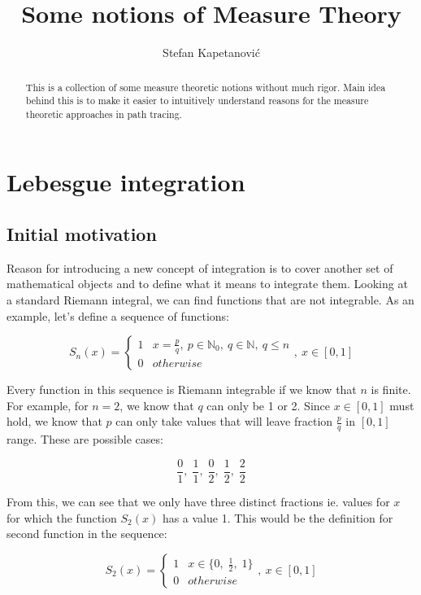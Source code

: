 \documentclass{article}
\title{Some notions of Measure Theory}
\author{Stefan Kapetanović}
\begin{document}
\maketitle

\begin{abstract}
This is a collection of some measure theoretic notions without much rigor. Main idea behind this is to make it easier to intuitively understand reasons for the measure theoretic approaches in path tracing.
\end{abstract}

\section{Lebesgue integration}
\subsection{Initial motivation}

Reason for introducing a new concept of integration is to cover another set of mathematical objects and to define what it means to integrate them. Looking at a standard Riemann integral, we can find functions that are not integrable. As an example, let's define a sequence of functions:

\[ S_n(x) = \begin{cases}
    1 & x = \frac{p}{q},\: p \in \mathbb{N}_0,\: q \in \mathbb{N},\: q \leq n \\
    0 & otherwise
\end{cases},\: x \in [0, 1] \]

Every function in this sequence is Riemann integrable if we know that $n$ is finite. For example, for $n=2$, we know that $q$ can only be 1 or 2. Since $x \in [0, 1]$ must hold, we know that $p$ can only take values that will leave fraction $\frac{p}{q}$ in $[0, 1]$ range. These are possible cases:

\[\frac{0}{1},\;\frac{1}{1},\;\frac{0}{2},\;\frac{1}{2},\;\frac{2}{2}\]

From this, we can see that we only have three distinct fractions ie. values for $x$ for which the function $S_2(x)$ has a value 1. This would be the definition for second function in the sequence:

\[S_2(x) = \begin{cases}
    1 & x \in \{0,\;\frac{1}{2},\;1\} \\
    0 & otherwise
\end{cases},\: x \in [0, 1] \]
\end{document}
